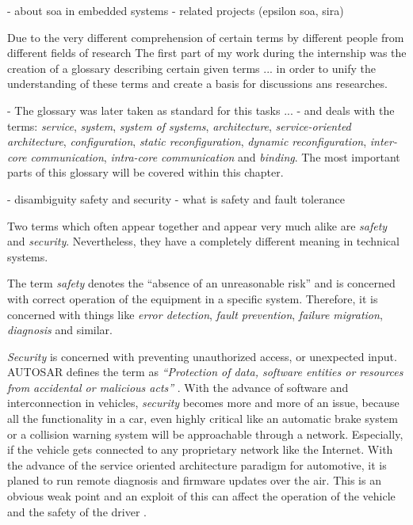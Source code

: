 \label{ch:introduction}
- about soa in embedded systems
- related projects (epsilon soa, sira)

Due to the very different comprehension of certain terms by different people from different fields of research 
The first part of my work during the internship was the creation of a glossary describing certain given terms
... in order to unify the understanding of these terms and create a basis for discussions ans researches.

- The glossary was later taken as standard for this tasks ...
- and deals with the terms: \emph{service}, \emph{system}, \emph{system of systems}, \emph{architecture}, \emph{service-oriented architecture}, \emph{configuration}, \emph{static reconfiguration}, \emph{dynamic reconfiguration}, \emph{inter-core communication}, \emph{intra-core communication} and \emph{binding}.
The most important parts of this glossary will be covered within this chapter.

- disambiguity safety and security
- what is safety and fault tolerance

Two terms which often appear together and appear very much alike are \emph{safety} and \emph{security}. Nevertheless, they have a completely different meaning in technical systems.

The term \emph{safety} denotes the ``absence of an unreasonable risk'' \cite{autosar_glossary} \cite{iso26262:1} and is concerned with correct operation of the equipment in a specific system. Therefore, it is concerned with things like \emph{error detection}, \emph{fault prevention}, \emph{failure migration}, \emph{diagnosis} and similar.

\emph{Security} is concerned with preventing unauthorized access, or unexpected input. AUTOSAR defines the term as \emph{``Protection of data, software entities or resources from accidental or malicious acts''} \cite{autosar_glossary}. With the advance of software and interconnection in vehicles, \emph{security} becomes more and more of an issue, because all the functionality in a car, even highly critical like an automatic brake system or a collision warning system will be approachable through a network. Especially, if the vehicle gets connected to any proprietary network like the Internet. With the advance of the service oriented architecture paradigm for automotive, it is planed to run remote diagnosis and firmware updates over the air. This is an obvious weak point and an exploit of this can affect the operation of the vehicle and the safety of the driver \cite{nilsson2008}.

